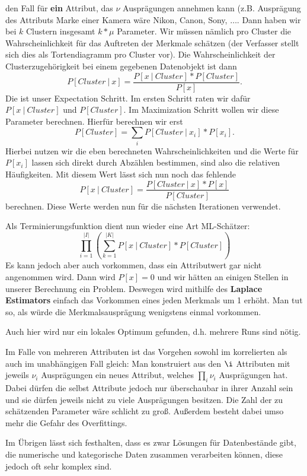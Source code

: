den Fall für \textbf{ein} Attribut, das \(\nu\) Ausprägungen annehmen kann
(z.B. Ausprägung des Attributs Marke einer Kamera wäre Nikon, Canon, Sony,
 \(\dots\). Dann haben wir bei \(k\) Clustern insgesamt \(k *\mu\) Parameter.
 Wir müssen nämlich pro Cluster die Wahrscheinlichkeit für das Auftreten der
 Merkmale schätzen (der Verfasser stellt sich dies als Tortendiagramm pro Cluster
 vor). Die Wahrscheinlichkeit der Clusterzugehörigkeit bei einem gegebenen 
 Datenobjekt ist dann
 \[ P[Cluster\ |\ x] = \frac{P[x\ |\ Cluster]*P[Cluster]}{P[x]}.\]
 Die ist unser Expectation Schritt. Im ersten Schritt raten wir dafür 
 \(P[x\ |\ Cluster]\) und \(P[Cluster]\). Im Maximization Schritt wollen
 wir diese Parameter berechnen. Hierfür berechnen wir erst
 \[ P[Cluster] = \sum_i P[Cluster\ |\ x_i]*P[x_i].\]
 Hierbei nutzen wir die eben berechneten Wahrscheinlichkeiten und die 
 Werte für \(P[x_i]\) lassen sich direkt durch Abzählen bestimmen, sind
 also die relativen Häufigkeiten. Mit diesem Wert lässt sich nun noch das 
 fehlende
 \[P[x\ |\ Cluster] = \frac{P[Cluster\ |\ x]*P[x]}{P[Cluster]}\]
 berechnen. Diese Werte werden nun für die nächsten Iterationen verwendet.
 
 Als Terminierungsfunktion dient nun wieder eine Art ML-Schätzer:
 \[\prod_{i=1}^{|I|}\left( \sum_{k=1}^{|K|}
 P[x\ |\ Cluster] * P[Cluster] \right)\]
 Es kann jedoch aber auch vorkommen, dass ein Attributwert gar nicht
 angenommen wird. Dann wird \(P[x] = 0\) und wir hätten an einigen
 Stellen in unserer Berechnung ein Problem. Deswegen wird mithilfe des
 \textbf{Laplace Estimators} einfach das Vorkommen eines jeden Merkmals um
 1 erhöht. Man tut so, als würde die Merkmalsausprägung wenigstens einmal
 vorkommen.
 
 Auch hier wird nur ein lokales Optimum gefunden, d.h. mehrere Runs sind nötig.

 Im Falle von mehreren Attributen ist das Vorgehen sowohl im korrelierten als auch
 im unabhängigen Fall gleich: Man konstruiert aus den \(\i\) Attributen mit
 jeweils \(\nu_i\) Ausprägungen ein neues Attribut, welches \(\prod_i \nu_i\) 
 Ausprägungen hat. Dabei dürfen die selbst Attribute jedoch nur überschaubar
 in ihrer Anzahl sein und sie dürfen jeweils nicht zu viele Ausprägungen besitzen.
 Die Zahl der zu schätzenden Parameter wäre schlicht zu groß. Außerdem besteht
 dabei umso mehr die Gefahr des Overfittings. 
 
 Im Übrigen lässt sich festhalten, dass es zwar Lösungen für Datenbestände gibt,
 die numerische und kategorische Daten zusammen verarbeiten können, diese
 jedoch oft sehr komplex sind.
 
